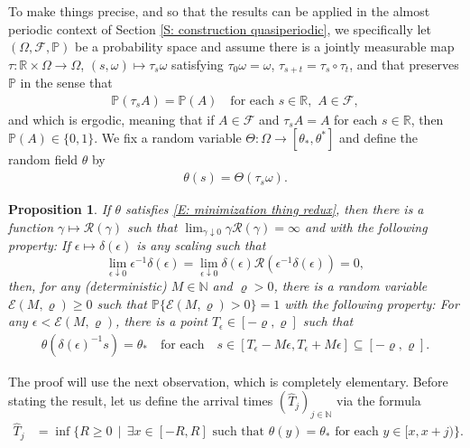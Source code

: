 \documentclass[12pt]{amsart}
\newtheorem{prop}{Proposition}
\begin{document}
To make things precise, and so that the results can be applied in the almost periodic context of Section \ref{S: construction quasiperiodic}, we specifically let $(\Omega,\mathcal{F},\mathbb{P})$ be a probability space and assume there is a jointly measurable map $\tau : \mathbb{R} \times \Omega \to \Omega$, $(s,\omega) \mapsto \tau_{s} \omega$ satisfying $\tau_{0} \omega = \omega$, $\tau_{s + t} = \tau_{s} \circ \tau_{t}$, and that preserves $\mathbb{P}$ in the sense that
	\begin{align*}
		\mathbb{P} ( \tau_{s} A ) = \mathbb{P} ( A ) \quad \text{for each} \, \, s \in \mathbb{R}, \, \, A \in \mathcal{F},
	\end{align*}
and which is ergodic, meaning that if $A \in \mathcal{F}$ and $\tau_{s} A = A$ for each $s \in \mathbb{R}$, then $\mathbb{P}(A) \in \{0,1\}$.  We fix a random variable $\Theta : \Omega \to [\theta_{*},\theta^{*}]$ and define the random field $\theta$ by 
	\begin{align*}
		\theta(s) = \Theta ( \tau_{s} \omega ).
	\end{align*}
	
\begin{prop} \label{P: one dimensional weird thing helper} If $\theta$ satisfies \eqref{E: minimization thing redux}, then there is a function $\gamma \mapsto \mathcal{R}(\gamma)$ such that $\lim_{\gamma \downarrow 0} \gamma \mathcal{R}(\gamma) = \infty$ and with the following property: If $\epsilon \mapsto \delta(\epsilon)$ is any scaling such that
		\begin{equation*}
			\lim_{\epsilon \downarrow 0} \epsilon^{-1} \delta(\epsilon) = \lim_{\epsilon \downarrow 0} \delta(\epsilon) \mathcal{R}(\epsilon^{-1} \delta(\epsilon)) = 0,
		\end{equation*}
	then, for any (deterministic) $M \in \mathbb{N}$ and $\varrho > 0$, there is a random variable $\mathcal{E}(M,\varrho) \geq 0$ such that $\mathbb{P}\{\mathcal{E}(M,\varrho) > 0\} = 1$ with the following property: For any $\epsilon < \mathcal{E}(M,\varrho)$, there is a point $T_{\epsilon} \in [-\varrho,\varrho]$ such that
		\begin{align*}
			\theta(\delta(\epsilon)^{-1} s) = \theta_{*} \quad \text{for each} \quad s \in [T_{\epsilon} - M \epsilon , T_{\epsilon} + M \epsilon] \subseteq [-\varrho, \varrho].
		\end{align*}\end{prop}


The proof will use the next observation, which is completely elementary. Before stating the result, let us define the arrival times $(\widehat{T}_{j})_{j \in \mathbb{N}}$ via the formula
	\begin{align*}
		\widehat{T}_{j} &= \inf \{ R \geq 0 \, \mid \, \exists x \in [-R,R] \, \, \text{such that} \, \, \theta(y) = \theta_{*} \, \, \text{for each} \, \, y \in [x, x + j) \}.
	\end{align*}
\end{document}
